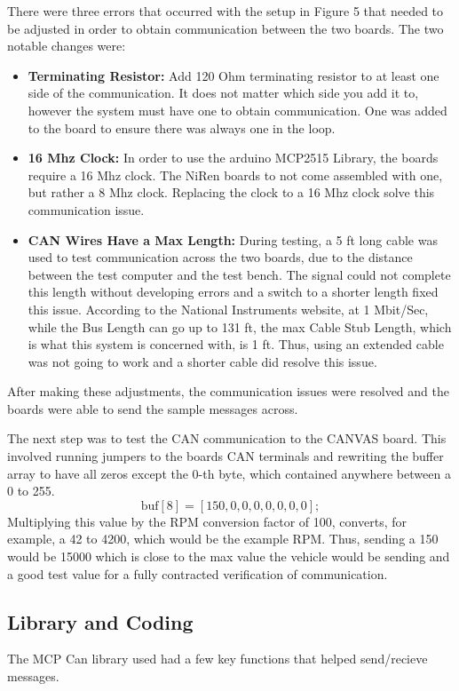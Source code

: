 \documentclass{article}
\begin{document}
There were three errors that occurred with the setup in Figure 5 that needed to be adjusted in order to obtain communication between the two boards. The two notable changes were:
\begin{itemize}
    \item \textbf{Terminating Resistor:} Add 120 Ohm terminating resistor to at least one side of the communication. It does not matter which side you add it to, however the system must have one to obtain communication. One was added to the board to ensure there was always one in the loop.
    \item \textbf{16 Mhz Clock:} In order to use the arduino MCP2515 Library, the boards require a 16 Mhz clock. The NiRen boards to not come assembled with one, but rather a 8 Mhz clock. Replacing the clock to a 16 Mhz clock solve this communication issue.
    \item \textbf{CAN Wires Have a Max Length:} During testing, a 5 ft long cable was used to test communication across the two boards, due to the distance between the test computer and the test bench. The signal could not complete this length without developing errors and a switch to a shorter length fixed this issue. According to the National Instruments website, at 1 Mbit/Sec, while the Bus Length can go up to 131 ft, the max Cable Stub Length, which is what this system is concerned with, is 1 ft. Thus, using an extended cable was not going to work and a shorter cable did resolve this issue. 
\end{itemize}

After making these adjustments, the communication issues were resolved and the boards were able to send the sample messages across.
\bigskip

The next step was to test the CAN communication to the CANVAS board. This involved running jumpers to the boards CAN terminals and rewriting the buffer array to have all zeros except the 0-th byte, which contained anywhere between a 0 to 255. 
\[\textrm{buf}[8] = [150,0,0,0,0,0,0,0];\]
Multiplying this value by the RPM conversion factor of 100, converts, for example, a 42 to 4200, which would be the example RPM. Thus, sending a 150 would be 15000 which is close to the max value the vehicle would be sending and a good test value for a fully contracted verification of communication. 
\subsection{Library and Coding}
The MCP Can library used had a few key functions that helped send/recieve messages.
\end{document}
